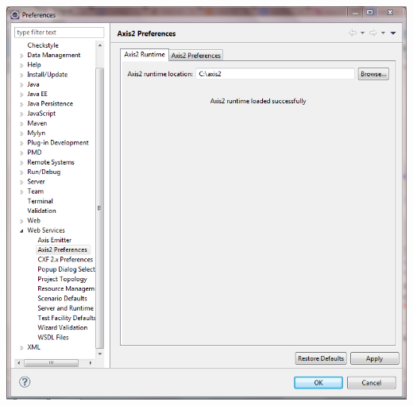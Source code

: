 \documentclass[12pt]{article}
\begin{document}
\begin{itemize}
\begin{itemize}
\begin{minipage}[t]{\linewidth}
{            \includegraphics[width=.95\linewidth]{axisconfig}%
          }


\end{minipage}
\end{itemize}
\end{itemize}
\end{document}
